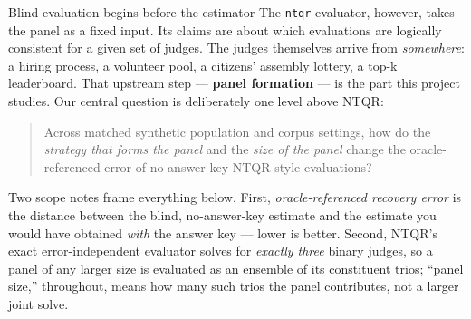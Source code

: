 \documentclass[
  ignorenonframetext,
]{beamer}
\begin{document}
\begin{frame}{Blind evaluation begins before
the estimator}
The \texttt{ntqr} evaluator, however, takes the panel as a fixed input.
Its claims are about which evaluations are logically consistent for a
given set of judges. The judges themselves arrive from \emph{somewhere}:
a hiring process, a volunteer pool, a citizens' assembly lottery, a
top-k leaderboard. That upstream step --- \textbf{panel formation} ---
is the part this project studies. Our central question is deliberately
one level above NTQR:

\begin{quote}
Across matched synthetic population and corpus settings, how do the
\emph{strategy that forms the panel} and the \emph{size of the panel}
change the oracle-referenced error of no-answer-key NTQR-style
evaluations?
\end{quote}

Two scope notes frame everything below. First, \emph{oracle-referenced
recovery error} is the distance between the blind, no-answer-key
estimate and the estimate you would have obtained \emph{with} the answer
key --- lower is better. Second, NTQR's exact error-independent
evaluator solves for \emph{exactly three} binary judges, so a panel of
any larger size is evaluated as an ensemble of its constituent trios;
``panel size,'' throughout, means how many such trios the panel
contributes, not a larger joint solve.
\end{frame}
\end{document}
